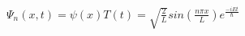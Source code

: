 \documentclass[preview]{standalone}
\begin{document}
\begin{center}
$\Psi_n(x,t) = \psi(x)T(t) = \sqrt{\frac{2}{L}}sin(\frac{n\pi x}{L})e^{\frac{-iEt}{\hbar}} $
\end{center}
\end{document}
